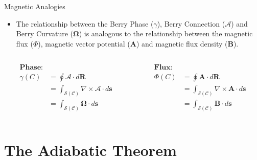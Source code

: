 \documentclass[9pt]{beamer}
\begin{document}
\begin{frame}{Magnetic Analogies}

    \begin{itemize}
      \item The relationship between the Berry Phase ($\gamma$), Berry Connection
            ($\bm{\mathcal{A}}$) and Berry Curvature ($\bm{\Omega}$) is analogous to the 
            relationship between the magnetic flux ($\Phi$), magnetic vector potential
            ($\bm{A}$) and magnetic flux density ($\bm{B}$).
    \end{itemize}
  
  \begin{columns}
    
    \begin{column}{0.5\textwidth}

       \begin{align*}
         \textbf{Phase:}&\\
         \gamma(C) &= \oint \bm{\mathcal{A}} \cdot d\bm{R} \\
                   &= \int_{\mathcal{S}(\mathcal{C})} 
                      \nabla \times \bm{\mathcal{A}} \cdot d\bm{s}\\
                   &= \int_{\mathcal{S}(\mathcal{C})} \bm{\Omega} \cdot d\bm{s}
       \end{align*}
       
    \end{column}

    \begin{column}{0.5\textwidth}
    
      \begin{align*}
        \textbf{Flux:}&\\
        \Phi(C) &= \oint \bm{A} \cdot d\bm{R} \\
                &= \int_{\mathcal{S}(\mathcal{C})}
                   \nabla \times \bm{A} \cdot d\bm{s} \\
                &= \int_{\mathcal{S}(\mathcal{C})} \bm{B} \cdot d\bm{s}
      \end{align*}

    \end{column}
  \end{columns}

  
\end{frame}
           

\section{The Adiabatic Theorem}
\end{document}
